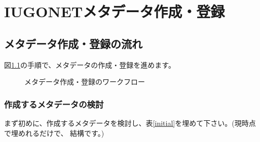 \chapter{IUGONETメタデータ作成・登録}

\section{メタデータ作成・登録の流れ}
図\ref{flow.eps}の手順で、メタデータの作成・登録を進めます。
\begin{figure}[H]
\begin{center}
\caption{メタデータ作成・登録のワークフロー}
\label{flow.eps}
\end{center}
\end{figure}

\renewcommand{\thesubsection}{(\roman{subsection})}
\subsection{作成するメタデータの検討}\label{check}

まず初めに、作成するメタデータを検討し、表\ref{initial}を埋めて下さい。(現時点で埋めれるだけで、
結構です。)

